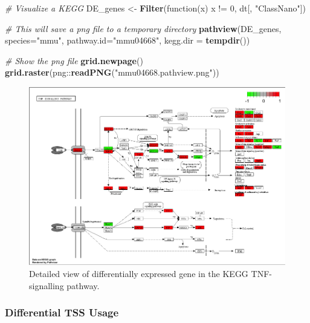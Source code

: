 \documentclass[9pt,a4paper,]{extarticle}
\newenvironment{Shaded}{\begin{snugshade}}{\end{snugshade}}
\newcommand{\KeywordTok}[1]{\textcolor[rgb]{0.13,0.29,0.53}{\textbf{{#1}}}}
\newcommand{\DataTypeTok}[1]{\textcolor[rgb]{0.13,0.29,0.53}{{#1}}}
\newcommand{\DecValTok}[1]{\textcolor[rgb]{0.00,0.00,0.81}{{#1}}}
\newcommand{\StringTok}[1]{\textcolor[rgb]{0.31,0.60,0.02}{{#1}}}
\newcommand{\CommentTok}[1]{\textcolor[rgb]{0.56,0.35,0.01}{\textit{{#1}}}}
\newcommand{\NormalTok}[1]{{#1}}
\begin{document}
\begin{Shaded}
\begin{Highlighting}[]
\CommentTok{# Visualize a KEGG}
\NormalTok{DE_genes <-}\StringTok{ }\KeywordTok{Filter}\NormalTok{(function(x) x !=}\StringTok{ }\DecValTok{0}\NormalTok{, dt[, }\StringTok{"ClassNano"}\NormalTok{])}

\CommentTok{# This will save a png file to a temporary directory}
\KeywordTok{pathview}\NormalTok{(DE_genes, }\DataTypeTok{species=}\StringTok{"mmu"}\NormalTok{, }\DataTypeTok{pathway.id=}\StringTok{"mmu04668"}\NormalTok{, }\DataTypeTok{kegg.dir =} \KeywordTok{tempdir}\NormalTok{())}

\CommentTok{# Show the png file}
\KeywordTok{grid.newpage}\NormalTok{()}
\KeywordTok{grid.raster}\NormalTok{(png::}\KeywordTok{readPNG}\NormalTok{(}\StringTok{"mmu04668.pathview.png"}\NormalTok{))}
\end{Highlighting}
\end{Shaded}

\begin{figure}

{\centering \includegraphics{CAGEWorkflow_files/figure-latex/pathview-1} 

}

\caption{Detailed view of differentially expressed gene in the KEGG TNF-signalling pathway.}\label{fig:pathview}
\end{figure}

\subsubsection{Differential TSS Usage}\label{differential-tss-usage}
\end{document}
